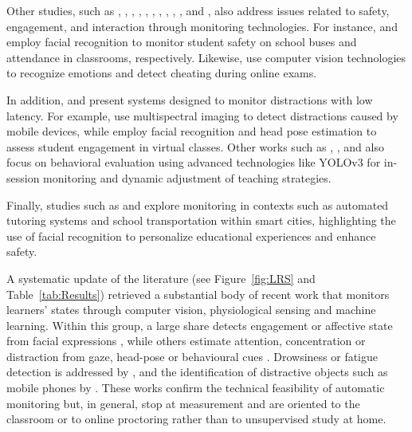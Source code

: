 Other studies, such as \cite{Boumiza2017}, \cite{DaCosta2023}, \cite{Enadula2021}, \cite{Farsani2020}, \cite{Hachad2020}, \cite{James2019}, \cite{Kulkarni2023}, \cite{Kumar2024Zoom}, \cite{Muller2018ArchnSmile}, \cite{Narkhede2023}, and \cite{Ozdamli2022}, also address issues related to safety, engagement, and interaction through monitoring technologies. For instance, \cite{Hachad2020} and \cite{James2019} employ facial recognition to monitor student safety on school buses and attendance in classrooms, respectively. Likewise, \cite{Ozdamli2022} use computer vision technologies to recognize emotions and detect cheating during online exams.

In addition, \cite{Campbell2015Using} and \cite{Ucar2022Recognizing} present systems designed to monitor distractions with low latency. For example, \cite{Campbell2015Using} use multispectral imaging to detect distractions caused by mobile devices, while \cite{Ucar2022Recognizing} employ facial recognition and head pose estimation to assess student engagement in virtual classes. Other works such as \cite{Argel2023Intellitell}, \cite{Erazo2016Easing}, and \cite{Nguyen2019} also focus on behavioral evaluation using advanced technologies like YOLOv3 for in-session monitoring and dynamic adjustment of teaching strategies.

Finally, studies such as \cite{Boumiza2017} and \cite{DaCosta2023} explore monitoring in contexts such as automated tutoring systems and school transportation within smart cities, highlighting the use of facial recognition to personalize educational experiences and enhance safety.

A systematic update of the literature (see Figure~\ref{fig:LRS} and Table~\ref{tab:Results}) retrieved a substantial body of recent work that monitors learners' states through computer vision, physiological sensing and machine learning. Within this group, a large share detects engagement or affective state from facial expressions \citep{Alalwani2016Combined, Wang2018Attention, Ashwin2020Impact, Yu2021Measuring, R2022Drowsiness, Daksith2023Multi, Prince2024Investigating, Qi2024Evaluation, K2025Capture, R2026Emotion, Singh2026Utilizing}, while others estimate attention, concentration or distraction from gaze, head-pose or behavioural cues \citep{Robal2018WebcamBased, Rk2020RealTime, Lee2022Wedar, Xu2024Identifying, Barrial2025Tool, Ramana2025Challenges, B2025Yolov8Based, Hanif2025RealTime, Bhimavarapu2025Leveraging}. Drowsiness or fatigue detection is addressed by \citep{R2022Drowsiness, Wang2022Online, Ramana2025Challenges, Nirosha2025Drowsiness, Hanif2025RealTime, Singh2026Utilizing}, and the identification of distractive objects such as mobile phones by \citep{Xu2024Identifying, B2025Yolov8Based, Singh2026Utilizing}. These works confirm the technical feasibility of automatic monitoring but, in general, stop at measurement and are oriented to the classroom or to online proctoring rather than to unsupervised study at home.

